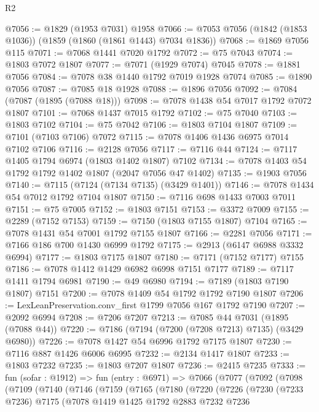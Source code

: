 \begin{lexlean}{R2}
\begin{coremodule}
@7056 := @1829 (@1953 @7031) @1958
@7066 := @7053 @7056 (@1842 (@1853 @1036)) (@1859 (@1860 (@1861 @1443) @7034 @1836))
@7068 := @1869 @7056 @115
@7071 := @7068 @1441 @7020 @1792
@7072 := @75 @7043
@7074 := @1803 @7072 @1807
@7077 := @7071 (@1929 @7074) @7045
@7078 := @1881 @7056
@7084 := @7078 @38 @1440 @1792 @7019 @1928 @7074
@7085 := @1890 @7056
@7087 := @7085 @18 @1928
@7088 := @1896 @7056
@7092 := @7084 (@7087 (@1895 (@7088 @18)))
@7098 := @7078 @1438 @54 @7017 @1792 @7072 @1807
@7101 := @7068 @1437 @7015 @1792
@7102 := @75 @7040
@7103 := @1803 @7102
@7104 := @75 @7042
@7106 := @1803 @7104 @1807
@7109 := @7101 (@7103 @7106) @7072
@7115 := @7078 @1406 @1436 @6975 @7014 @7102 @7106
@7116 := @2128 @7056
@7117 := @7116 @44
@7124 := @7117 @1405 @1794 @6974 (@1803 @1402 @1807) @7102
@7134 := @7078 @1403 @54 @1792 @1792 @1402 @1807 (@2047 @7056 @47 @1402)
@7135 := @1903 @7056
@7140 := @7115 (@7124 (@7134 @7135) (@3429 @1401))
@7146 := @7078 @1434 @54 @7012 @1792 @7104 @1807
@7150 := @7116 @698 @1433 @7003 @7011
@7151 := @75 @7005
@7152 := @1803 @7151
@7153 := @3372 @7009
@7155 := @2289 (@7152 @7153)
@7159 := @7150 (@1803 @7155 @1807) @7104
@7165 := @7078 @1431 @54 @7001 @1792 @7155 @1807
@7166 := @2281 @7056
@7171 := @7166 @186 @700 @1430 @6999 @1792
@7175 := @2913 (@6147 @6988 @3332 @6994)
@7177 := @1803 @7175 @1807
@7180 := @7171 (@7152 @7177) @7155
@7186 := @7078 @1412 @1429 @6982 @6998 @7151 @7177
@7189 := @7117 @1411 @1794 @6981
@7190 := @49 @6980
@7194 := @7189 (@1803 @7190 @1807) @7151
@7200 := @7078 @1409 @54 @1792 @1792 @7190 @1807
@7206 := LexLeanPreservation.conv_first @1799 @7056 @167 @1792 @7190
@7207 := @2092 @6994
@7208 := @7206 @7207
@7213 := @7085 @44 @7031 (@1895 (@7088 @44))
@7220 := @7186 (@7194 (@7200 (@7208 @7213) @7135) (@3429 @6980))
@7226 := @7078 @1427 @54 @6996 @1792 @7175 @1807
@7230 := @7116 @887 @1426 @6006 @6995
@7232 := @2134 @1417 @1807
@7233 := @1803 @7232
@7235 := @1803 @7207 @1807
@7236 := @2415 @7235
@7333 := fun (sofar : @1912) =>
  fun (entry : @6971) =>
  @7066
    (@7077
      (@7092
        (@7098
          (@7109
            (@7140
              (@7146
                (@7159
                  (@7165
                    (@7180
                      (@7220
                        (@7226
                          (@7230
                            (@7233 @7236)
                            @7175
                            (@7078
                              @1419
                              @1425
                              @1792
                              @2883
                              @7232
                              @7236

\end{coremodule}
\end{lexlean}
